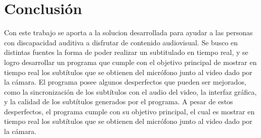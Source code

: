 \documentclass[conference]{IEEEtran}
\begin{document}
\section{Conclusión}
Con este trabajo se aporta a la solucion desarrollada para ayudar a las personas con discapacidad auditiva a disfrutar de contenido audiovisual.
Se busco en distintas fuentes la forma de poder realizar un subtitulado en tiempo real, y se logro desarrollar un programa que cumple con el objetivo principal de mostrar en tiempo real los subtítulos que se obtienen del micrófono junto al video dado por la cámara.
El programa posee algunos desperfectos que pueden ser mejorados, como la sincronización de los subtítulos con el audio del video, la interfaz gráfica, y la calidad de los subtítulos generados por el programa. A pesar de estos desperfectos, el programa cumple con su objetivo principal, el cual es mostrar en tiempo real los subtítulos que se obtienen del micrófono junto al video dado por la cámara.

\nocite{*}
\printbibliography
\end{document}
